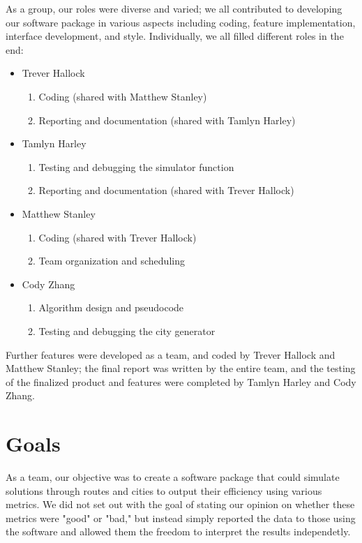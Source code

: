 \documentclass{article}
\begin{document}
As a group, our roles were diverse and varied; we all contributed to developing our software package in various aspects including coding, feature implementation, interface development, and style.  Individually, we all filled different roles in the end:

\begin{itemize}
	\item Trever Hallock
	\begin{enumerate}
		\item Coding (shared with Matthew Stanley)
		\item Reporting and documentation (shared with Tamlyn Harley)
	\end{enumerate}
	\item Tamlyn Harley
	\begin{enumerate}
		\item Testing and debugging the simulator function
		\item Reporting and documentation (shared with Trever Hallock)
	\end{enumerate}
	\item Matthew Stanley
	\begin{enumerate}
		\item Coding (shared with Trever Hallock)
		\item Team organization and scheduling
	\end{enumerate}
	\item Cody Zhang
	\begin{enumerate}
		\item Algorithm design and pseudocode
		\item Testing and debugging the city generator
	\end{enumerate}
\end{itemize}

Further features were developed as a team, and coded by Trever Hallock and Matthew Stanley; the final report was written by the entire team, and the testing of the finalized product and features were completed by Tamlyn Harley and Cody Zhang.


\section{Goals}

As a team, our objective was to create a software package that could simulate solutions through routes and cities to output their efficiency using various metrics.  We did not set out with the goal of stating our opinion on whether these metrics were "good" or "bad," but instead simply reported the data to those using the software and allowed them the freedom to interpret the results independetly. 
\end{document}

